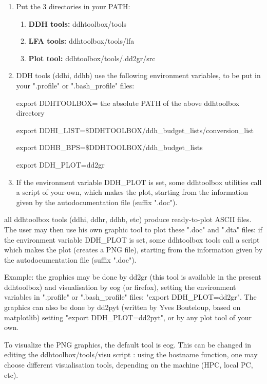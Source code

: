 \begin{enumerate}
  \item Put the 3 directories in your PATH:
    \begin{enumerate}
      \item {\bf DDH tools:} ddhtoolbox/tools
      \item {\bf LFA tools:} ddhtoolbox/tools/lfa
      \item {\bf Plot tool:} ddhtoolbox/tools/.dd2gr/src
    \end{enumerate}
  \item DDH tools (ddhi, ddhb) use the following environment variables, to be put in your ".profile" or ".bash\_profile" files:

    export DDHTOOLBOX= the absolute PATH of the above ddhtoolbox directory

    export DDHI\_LIST=\$DDHTOOLBOX/ddh\_budget\_lists/conversion\_list

    export DDHB\_BPS=\$DDHTOOLBOX/ddh\_budget\_lists

    export DDH\_PLOT=dd2gr


    \item \label{ddhplot} If the environment variable DDH\_PLOT is set, some ddhtoolbox utilities call a script of your own, which makes the plot, starting from the information given by the autodocumentation file (suffix ".doc").
\end{enumerate}

 all ddhtoolbox tools (ddhi, ddhr, ddhb, etc) produce ready-to-plot ASCII files. The user may then use his own graphic tool to plot these ".doc" and ".dta" files: if the environment variable DDH\_PLOT is set, some ddhtoolbox tools call a script which makes the plot (creates a PNG file), starting from the information given by the autodocumentation file (suffix ".doc").

\p Example: the graphics may be done by dd2gr (this tool is available in the present ddhtoolbox) and visualisation by eog (or firefox), setting the environment variables in ".profile" or ".bash\_profile" files: "export DDH\_PLOT=dd2gr". The graphics can also be done by dd2pyt (written by Yves Bouteloup, based on matplotlib) setting "export DDH\_PLOT=dd2pyt", or by any plot tool of your own.

\p To visualize the PNG graphics, the default tool is eog. This can be changed in editing the ddhtoolbox/tools/visu script : using the hostname function, one may choose different visualisation tools, depending on the machine (HPC, local PC, etc).

